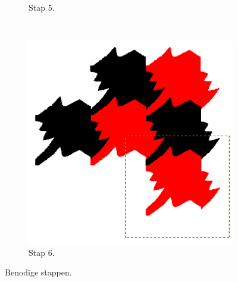 \documentclass{article}
\begin{document}
\begin{figure}[Hh]
\begin{subfigure}[b]{0.3\textwidth}
        \caption{Stap 5.}
        \label{fig:stap5}
    \end{subfigure}%
     ~
    \begin{subfigure}[b]{0.3\textwidth}    
        \includegraphics[width=\textwidth]{piece6.png}
        \caption{Stap 6.}
        \label{fig:stap6}
    \end{subfigure}%
	\caption{Benodige stappen.}
	\label{fig:tesselatie}
\end{figure}
\end{document}
